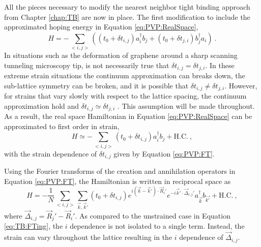 All the pieces necessary to modify the nearest neighbor tight binding approach from Chapter \ref{chap:TB} are now in place.
The first modification to include the approximated hoping energy in Equation \ref{eq:PVP:RealSpace},
\begin{equation*}
  H=-\sum_{<i,j>} \left( (t_0+\delta t_{i,j})  a_i^{\dagger} b_j + (t_0+\delta t_{j,i}) b_j^{\dagger} a_i \right) \ .
\end{equation*}
In situations such as the deformation of graphene around a sharp scanning tunneling microscopy tip, is not necessarily true that $\delta t_{i,j} = \delta t_{j,i}$.
In these extreme strain situations the continuum approximation can breaks down, the sub-lattice symmetry can be broken, and it is possible that $\delta t_{i,j} \neq \delta t_{j,i}$.
However, for strains that vary slowly with respect to the lattice spacing, the continuum approximation hold and $\delta t_{i,j} \simeq \delta t_{j,i}$ \cite{Sloan2013}.
This assumption will be made throughout.
As a result, the real space Hamiltonian in Equation \ref{eq:PVP:RealSpace} can be approximated to first order in strain,
\begin{equation*}
  H \simeq -\sum_{<i,j>} \left( t_0+\delta t_{i,j} \right)  a_i^{\dagger} b_j + \text{H.C.} \ ,
\end{equation*}
with the strain dependence of $\delta t_{i,j}$ given by Equation \ref{eq:PVP:FT}.

Using the Fourier transforms of the creation and annihilation operators in Equation \ref{eq:PVP:FT}, the Hamiltonian is written in reciprocal space as 
\begin{equation*}
  H=-\frac{1}{N} \sum_{<i,j>} \sum_{\vec{k},\vec{k}'} \left( t_0+\delta t_{i,j} \right)
    e^{i(\vec{k}-\vec{k}')\cdot \vec{R}_i'}
    e^{-i\vec{k}'\cdot \vec{\Delta}_{i,j}'}
    a_{\vec{k}}^{\dagger} b_{\vec{k'}} +\text{H.C.}\ ,
\end{equation*}
where $\vec{\Delta}_{i,j}=\vec{R}_j'-\vec{R}_i'$.
As compared to the unstrained case in Equation \ref{eq:TB:FTing}, the $i$ dependence is not isolated to a single term.
Instead, the strain can vary throughout the lattice resulting in the $i$ dependence of $\vec{\Delta}_{i,j}$.

